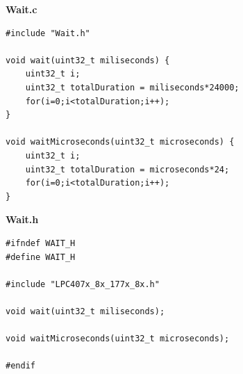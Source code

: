 \documentclass{article}
\begin{document}
\linebreak
\textbf{Wait.c}
\begin{lstlisting}
#include "Wait.h"

void wait(uint32_t miliseconds) {
	uint32_t i;
	uint32_t totalDuration = miliseconds*24000;
	for(i=0;i<totalDuration;i++);
}

void waitMicroseconds(uint32_t microseconds) {
	uint32_t i;
	uint32_t totalDuration = microseconds*24;
	for(i=0;i<totalDuration;i++);
}
\end{lstlisting}
\linebreak
\textbf{Wait.h}
\begin{lstlisting}
#ifndef WAIT_H
#define WAIT_H

#include "LPC407x_8x_177x_8x.h"

void wait(uint32_t miliseconds);

void waitMicroseconds(uint32_t microseconds);

#endif
\end{lstlisting}
\linebreak
\textbf{}
\begin{lstlisting}
\end{lstlisting}
\linebreak
\textbf{}
\begin{lstlisting}
\end{lstlisting}
\linebreak
\textbf{}
\begin{lstlisting}
\end{lstlisting}
\linebreak
\textbf{}
\begin{lstlisting}
\end{lstlisting}
\linebreak
\textbf{}
\begin{lstlisting}
\end{lstlisting}
\linebreak
\textbf{}
\begin{lstlisting}
\end{lstlisting}
\end{document}
